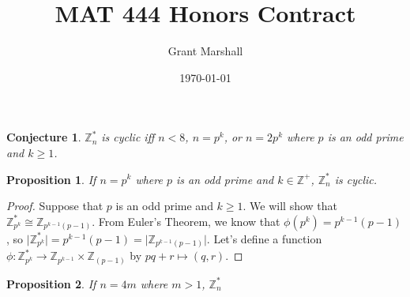 \documentclass[a4paper]{article}
\title{MAT 444 Honors Contract}
\author{Grant Marshall}
\date{\today}
\newtheorem{prop}{Proposition}
\newtheorem{conj}{Conjecture}
\theoremstyle{definition}
\begin{document}
\maketitle

\begin{conj}
$\mathbb{Z}_n^*$ is cyclic iff $n < 8$, $n = p^k$, or $n = 2p^k$ where $p$ is an odd prime and $k \geq 1$.
\end{conj}

\begin{prop}
If $n = p^k$ where $p$ is an odd prime and $k \in \mathbb{Z}^+$, $\mathbb{Z}_n^\ast$ is cyclic.
\end{prop}

\begin{proof}
Suppose that $p$ is an odd prime and $k \geq 1$. We will show that $\mathbb{Z}_{p^k}^* \cong \mathbb{Z}_{p^{k - 1}(p - 1)}$. From Euler's Theorem, we know that $\phi(p^k) = p^{k - 1}(p - 1)$, so $\lvert \mathbb{Z}_{p^k}^* \rvert = p^{k - 1}(p - 1) = \lvert \mathbb{Z}_{p^{k - 1}(p - 1)} \rvert$. Let's define a function $\phi: \mathbb{Z}_{p^k}^* \to \mathbb{Z}_{p^{k - 1}} \times \mathbb{Z}_{(p - 1)}$ by $pq + r \mapsto (q, r)$.
\end{proof}

\begin{prop}
If $n = 4m$ where $m > 1$, $\mathbb{Z}_n^*$
\end{prop}
\end{document}
